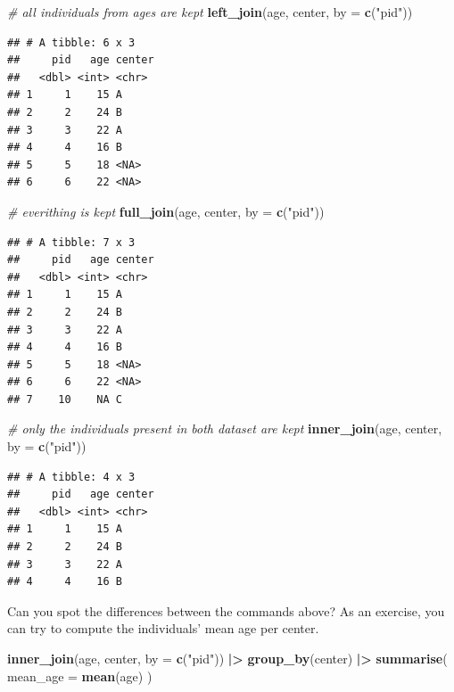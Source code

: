 \documentclass[
]{book}
\newenvironment{Shaded}{\begin{snugshade}}{\end{snugshade}}
\newcommand{\AttributeTok}[1]{\textcolor[rgb]{0.13,0.29,0.53}{#1}}
\newcommand{\CommentTok}[1]{\textcolor[rgb]{0.56,0.35,0.01}{\textit{#1}}}
\newcommand{\FunctionTok}[1]{\textcolor[rgb]{0.13,0.29,0.53}{\textbf{#1}}}
\newcommand{\NormalTok}[1]{#1}
\newcommand{\SpecialCharTok}[1]{\textcolor[rgb]{0.81,0.36,0.00}{\textbf{#1}}}
\newcommand{\StringTok}[1]{\textcolor[rgb]{0.31,0.60,0.02}{#1}}
\theoremstyle{definition}
\theoremstyle{definition}
\theoremstyle{definition}
\theoremstyle{definition}
\theoremstyle{remark}
\begin{document}
\begin{Shaded}
\begin{Highlighting}[]
\CommentTok{\# all individuals from ages are kept}
\FunctionTok{left\_join}\NormalTok{(age, center, }\AttributeTok{by =} \FunctionTok{c}\NormalTok{(}\StringTok{"pid"}\NormalTok{))}
\end{Highlighting}
\end{Shaded}

\begin{verbatim}
## # A tibble: 6 x 3
##     pid   age center
##   <dbl> <int> <chr> 
## 1     1    15 A     
## 2     2    24 B     
## 3     3    22 A     
## 4     4    16 B     
## 5     5    18 <NA>  
## 6     6    22 <NA>
\end{verbatim}

\begin{Shaded}
\begin{Highlighting}[]
\CommentTok{\# everithing is kept}
\FunctionTok{full\_join}\NormalTok{(age, center, }\AttributeTok{by =} \FunctionTok{c}\NormalTok{(}\StringTok{"pid"}\NormalTok{))}
\end{Highlighting}
\end{Shaded}

\begin{verbatim}
## # A tibble: 7 x 3
##     pid   age center
##   <dbl> <int> <chr> 
## 1     1    15 A     
## 2     2    24 B     
## 3     3    22 A     
## 4     4    16 B     
## 5     5    18 <NA>  
## 6     6    22 <NA>  
## 7    10    NA C
\end{verbatim}

\begin{Shaded}
\begin{Highlighting}[]
\CommentTok{\# only the individuals present in both dataset are kept}
\FunctionTok{inner\_join}\NormalTok{(age, center, }\AttributeTok{by =} \FunctionTok{c}\NormalTok{(}\StringTok{"pid"}\NormalTok{))}
\end{Highlighting}
\end{Shaded}

\begin{verbatim}
## # A tibble: 4 x 3
##     pid   age center
##   <dbl> <int> <chr> 
## 1     1    15 A     
## 2     2    24 B     
## 3     3    22 A     
## 4     4    16 B
\end{verbatim}

Can you spot the differences between the commands above?
As an exercise, you can try to compute the individuals' mean age per center.

\begin{Shaded}
\begin{Highlighting}[]
\FunctionTok{inner\_join}\NormalTok{(age, center, }\AttributeTok{by =} \FunctionTok{c}\NormalTok{(}\StringTok{"pid"}\NormalTok{)) }\SpecialCharTok{|\textgreater{}}
  \FunctionTok{group\_by}\NormalTok{(center) }\SpecialCharTok{|\textgreater{}}
  \FunctionTok{summarise}\NormalTok{(}
    \AttributeTok{mean\_age =} \FunctionTok{mean}\NormalTok{(age)}
\NormalTok{  )}
\end{Highlighting}
\end{Shaded}
\end{document}
